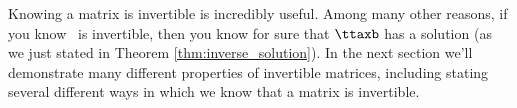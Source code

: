 \medskip



Knowing a matrix is invertible is incredibly useful. Among many other reasons, if you know \tta\ is invertible, then you know for sure that $\ttaxb$ has a solution (as we just stated in Theorem \ref{thm:inverse_solution}). In the next section we'll demonstrate many different properties of invertible matrices, including stating several different ways in which we know that a matrix is invertible.




